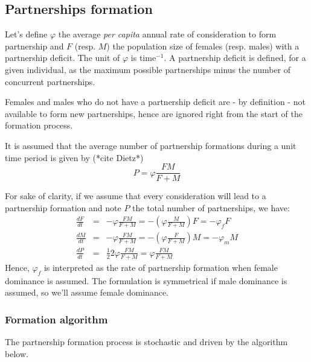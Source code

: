 \documentclass[11pt, onecolumn]{article}
\begin{document}


\subsection{Partnerships formation}

Let's define $\varphi$ the average \textit{per capita} annual rate of consideration to form partnership and $F$ (resp. $M$) the population size of females (resp. males) with a partnership deficit. The unit of $\varphi$ is time$^{-1}$. A partnership deficit is defined, for a given individual, as the maximum possible partnerships minus the number of concurrent partnerships. 

Females and males who do not have a partnership deficit are - by definition - not available to form new partnerships, hence are ignored right from the start of the formation process.

It is assumed that the average number of partnership formations during a unit time period is given by (*cite Dietz*) 
$$P = \varphi\frac{FM}{F+M}$$

For sake of clarity, if we assume that every consideration will lead to a partnership formation and note $P$ the total number of partnerships, we have:
\begin{eqnarray*}
\frac{dF}{dt} & = & - \varphi\frac{FM}{F+M} =  -\left(\varphi\frac{M}{F+M}\right) F = -\varphi_f F\\
\frac{dM}{dt} & = & - \varphi\frac{FM}{F+M} =  -\left(\varphi\frac{F}{F+M}\right) M = -\varphi_m M\\
\frac{dP}{dt} & = & \frac{1}{2}2\varphi\frac{FM}{F+M} = \varphi\frac{FM}{F+M}
\end{eqnarray*}
Hence, $\varphi_f$ is interpreted as the rate of partnership formation when female dominance is assumed. The formulation is symmetrical if male dominance is assumed, so we'll assume female dominance.


\subsubsection{Formation algorithm}

The partnership formation process is stochastic and driven by the algorithm below. 
\end{document}
